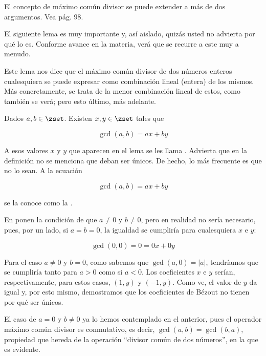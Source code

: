 El concepto de máximo común divisor se puede extender a más de dos
argumentos. Vea \cite{rosen} pág. 98.

El siguiente lema es muy importante y, así aislado, quizás usted no advierta
por qué lo es. Conforme avance en la materia, verá que se recurre a este muy
a menudo.

Este lema nos dice que el máximo común divisor de dos números enteros
cualesquiera se puede expresar como combinación lineal (entera) de los
mismos. Más concretamente, se trata de la menor combinación lineal de estos,
como también se verá; pero esto último, más adelante.

\begin{lemma}\label{th-bezout}
  Dados $a, b \in \zset$. Existen $x, y \in \zset$ tales que

  $$ \gcd(a, b) = ax + by $$
\end{lemma}


A esos valores $x$ y $y$ que aparecen en el lema se les llama
. Advierta que en la definición no se menciona que
deban ser únicos. De hecho, lo más frecuente es que no lo sean. A la
ecuación

$$ \gcd(a, b) = ax + by $$

\noindent se la conoce como la .

En \cite{texto-uned} ponen la condición de que $a \neq 0$ y $b \neq
0$, pero en realidad no sería necesario, pues, por un lado, si $a = b = 0$,
la igualdad se cumpliría para cualesquiera $x$ e $y$:

$$ \gcd(0, 0) = 0 = 0x + 0y $$

Para el caso $a \neq 0$ y $b = 0$, como sabemos que $\gcd(a, 0) = |a|$,
tendríamos que se cumpliría tanto para $a > 0$ como si $a < 0$. Los
coeficientes $x$ e $y$ serían, respectivamente, para estos casos, $(1, y)$ y
$({-1}, y)$. Como ve, el valor de $y$ da igual y, por esto mismo,
demostramos que los coeficientes de Bézout no tienen por qué ser únicos.

El caso de $a = 0$ y $b \neq 0$ ya lo hemos contemplado en el anterior, pues
el operador máximo común divisor es conmutativo, es decir, $\gcd(a, b) =
\gcd(b, a)$, propiedad que hereda de la operación ``divisor común de dos
números'', en la que es evidente.


